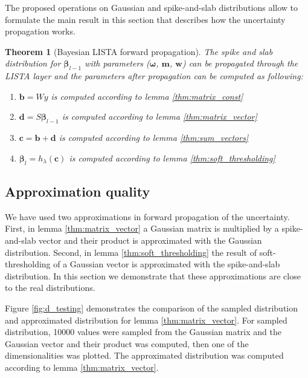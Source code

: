 \documentclass[letterpaper]{article}
\newtheorem{theorem}{Theorem}
\begin{document}
The proposed operations on Gaussian and spike-and-slab distributions allow to formulate the main result in this section that describes how the uncertainty propagation works.
\begin{theorem}[Bayesian LISTA forward propagation]
\label{thm:prob_layer}
The spike and slab distribution for $\boldsymbol\beta_{l-1}$ with parameters ($\boldsymbol\omega$, $\mathbf{m}$, $\mathbf{w}$) can be propagated through the LISTA layer and the parameters after propagation can be computed as following:
\begin{enumerate}
	\item $\mathbf{b} = Wy$ is computed according to lemma \ref{thm:matrix_const}
	\item $\mathbf{d} = S\boldsymbol\beta_{l-1}$ is computed according to lemma \ref{thm:matrix_vector}
	\item $\mathbf{c} = \mathbf{b} + \mathbf{d}$ is computed according to lemma \ref{thm:sum_vectors}
	\item $\boldsymbol\beta_{l} = h_\lambda(\mathbf{c})$ is computed according to lemma \ref{thm:soft_thresholding}
\end{enumerate}
\end{theorem}

\subsection{Approximation quality}
We have used two approximations in forward propagation of the uncertainty. First, in lemma \ref{thm:matrix_vector} a Gaussian matrix is multiplied by a spike-and-slab vector and their product is approximated with the Gaussian distribution. Second, in lemma \ref{thm:soft_thresholding} the result of soft-thresholding of a Gaussian vector is approximated with the spike-and-slab distribution. In this section we demonstrate that these approximations are close to the real distributions.

Figure \ref{fig:d_testing} demonstrates the comparison of the sampled distribution and approximated distribution for lemma \ref{thm:matrix_vector}. For sampled distribution, 10000 values were sampled from the Gaussian matrix and the Gaussian vector and their product was computed, then one of the dimensionalities was plotted. The approximated distribution was computed according to lemma \ref{thm:matrix_vector}.
\end{document}
